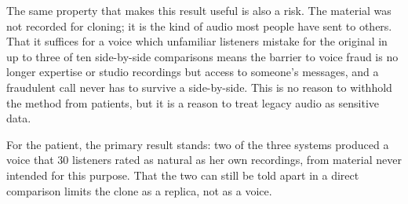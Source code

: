 The same property that makes this result useful is also a risk. The material
was not recorded for cloning; it is the kind of audio most people have sent to
others. That it suffices for a voice which unfamiliar listeners mistake for the
original in up to three of ten side-by-side comparisons means the barrier to
voice fraud is no longer expertise or studio recordings but access to someone's
messages, and a fraudulent call never has to survive a side-by-side. This is no
reason to withhold the method from patients, but it is a reason to treat legacy
audio as sensitive data.

For the patient, the primary result stands: two of the three systems produced a
voice that $30$ listeners rated as natural as her own recordings, from material
never intended for this purpose. That the two can still be told apart in a
direct comparison limits the clone as a replica, not as a voice.
